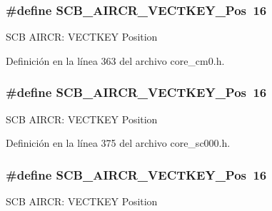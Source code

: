 \subsubsection[{\texorpdfstring{S\+C\+B\+\_\+\+A\+I\+R\+C\+R\+\_\+\+V\+E\+C\+T\+K\+E\+Y\+\_\+\+Pos}{SCB_AIRCR_VECTKEY_Pos}}]{\setlength{\rightskip}{0pt plus 5cm}\#define S\+C\+B\+\_\+\+A\+I\+R\+C\+R\+\_\+\+V\+E\+C\+T\+K\+E\+Y\+\_\+\+Pos~16}\hypertarget{group___c_m_s_i_s___s_c_b_gaaa27c0ba600bf82c3da08c748845b640}{}\label{group___c_m_s_i_s___s_c_b_gaaa27c0ba600bf82c3da08c748845b640}
S\+CB A\+I\+R\+CR\+: V\+E\+C\+T\+K\+EY Position 

Definición en la línea 363 del archivo core\+\_\+cm0.\+h.

\subsubsection[{\texorpdfstring{S\+C\+B\+\_\+\+A\+I\+R\+C\+R\+\_\+\+V\+E\+C\+T\+K\+E\+Y\+\_\+\+Pos}{SCB_AIRCR_VECTKEY_Pos}}]{\setlength{\rightskip}{0pt plus 5cm}\#define S\+C\+B\+\_\+\+A\+I\+R\+C\+R\+\_\+\+V\+E\+C\+T\+K\+E\+Y\+\_\+\+Pos~16}\hypertarget{group___c_m_s_i_s___s_c_b_gaaa27c0ba600bf82c3da08c748845b640}{}\label{group___c_m_s_i_s___s_c_b_gaaa27c0ba600bf82c3da08c748845b640}
S\+CB A\+I\+R\+CR\+: V\+E\+C\+T\+K\+EY Position 

Definición en la línea 375 del archivo core\+\_\+sc000.\+h.

\subsubsection[{\texorpdfstring{S\+C\+B\+\_\+\+A\+I\+R\+C\+R\+\_\+\+V\+E\+C\+T\+K\+E\+Y\+\_\+\+Pos}{SCB_AIRCR_VECTKEY_Pos}}]{\setlength{\rightskip}{0pt plus 5cm}\#define S\+C\+B\+\_\+\+A\+I\+R\+C\+R\+\_\+\+V\+E\+C\+T\+K\+E\+Y\+\_\+\+Pos~16}\hypertarget{group___c_m_s_i_s___s_c_b_gaaa27c0ba600bf82c3da08c748845b640}{}\label{group___c_m_s_i_s___s_c_b_gaaa27c0ba600bf82c3da08c748845b640}
S\+CB A\+I\+R\+CR\+: V\+E\+C\+T\+K\+EY Position 

